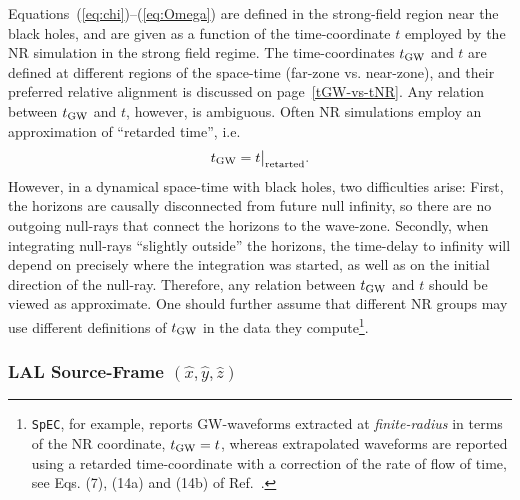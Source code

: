 \documentclass[11pt,tightenlines,article,amssymb,amsmath,amsfonts,superscriptaddress,nofootinbib]{revtex4}
\newcommand{\tGW}{t_{\rm GW}}
\newcommand{\ExS}{{{\hat x}}}
\newcommand{\EyS}{{{\hat y}}}
\newcommand{\EzS}{{{\hat z}}}
\begin{document}
Equations~(\ref{eq:chi})--(\ref{eq:Omega}) are defined in the
strong-field region near the black holes, and are given as a function
of the time-coordinate $t$ employed by the NR simulation in the strong
field regime. 
The time-coordinates $\tGW$ and $t$ are defined at different regions
of the space-time (far-zone vs. near-zone), and their preferred relative
alignment is discussed on page~\ref{tGW-vs-tNR}. Any relation between $\tGW$ and
$t$, however, is ambiguous.  Often NR simulations employ an approximation of
``retarded time'', i.e.
\begin{equation}
  \label{eq:tretarted}
  \tGW = t\big|_{\rm retarted}.
\end{equation}
However, in a dynamical space-time with black holes, two difficulties
arise: First, the horizons are causally disconnected from future null
infinity, so there are no outgoing null-rays that connect the horizons
to the wave-zone.  Secondly, when integrating null-rays ``slightly
outside'' the horizons, the time-delay to infinity will depend on
precisely where the integration was started, as well as on the initial
direction of the null-ray.  Therefore, any relation between $\tGW$ and
$t$ should be viewed as approximate. One should further assume that
different NR groups may use different definitions of $\tGW$ in the
data they compute\footnote{{\tt SpEC}, for example, reports GW-waveforms
extracted at \emph{finite-radius} in terms of the NR coordinate,
$\tGW=t$, whereas extrapolated waveforms are reported using a retarded
time-coordinate with a correction of the rate of flow of time, see
Eqs. (7), (14a) and (14b) of Ref.~\cite{Boyle:2009vi}.}.


\subsubsection{LAL Source-Frame \boldmath$(\ExS, \EyS, \EzS)$}
\end{document}
